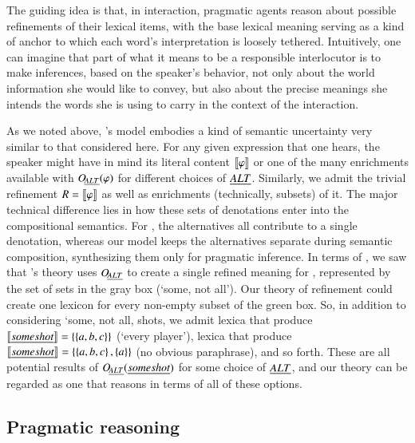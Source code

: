 \documentclass[leqno,12pt]{article}
\begin{document}
The guiding idea is that, in interaction, pragmatic agents reason
about possible refinements of their lexical items, with the base
lexical meaning serving as a kind of anchor to which each word's
interpretation is loosely tethered.  Intuitively, one can imagine that
part of what it means to be a responsible interlocutor is to make
inferences, based on the speaker's behavior, not only about the world
information she would like to convey, but also about the precise
meanings she intends the words she is using to carry in the context of
the interaction.


As we noted above, \CFS's model embodies a kind of semantic
uncertainty very similar to that considered here. For any given
expression that one hears, the speaker might have in mind its literal
content $\llbracket\varphi\rrbracket$ or one of the many enrichments available with
$\mathop{O\negthinspace_{\emph{ALT}}}(\varphi)$ for different choices of $\emph{ALT}$. Similarly, we admit
the trivial refinement $R = \llbracket\varphi\rrbracket$ as well as enrichments
(technically, subsets) of it. The major technical difference lies in
how these sets of denotations enter into the compositional
semantics. For \CFS, the alternatives all contribute to a single
denotation, whereas our model keeps the alternatives separate during
semantic composition, synthesizing them only for pragmatic
inference. In terms of , we saw that \CFS's theory
uses $\mathop{O\negthinspace_{\emph{ALT}}}$ to create a single refined meaning for ,
represented by the set of sets in the gray box (`some, not all'). Our
theory of refinement could create one lexicon for every non-empty
subset of the green box. So, in addition to considering `some, not
all, shots, we admit lexica that produce
$\llbracket\emph{some shot}\rrbracket = \left\{ \left\{ a,b,c \right\} \right\}$ (`every player'), lexica
that produce $\llbracket\emph{some shot}\rrbracket = \left\{ \left\{ a,b,c \right\},\left\{ a \right\} \right\}$
(no obvious paraphrase), and so forth. These are all potential results
of $\mathop{O\negthinspace_{\emph{ALT}}}(\emph{some shot})$ for some choice of $\emph{ALT}$, and our theory
can be regarded as one that reasons in terms of all of these options.


\subsection{Pragmatic reasoning}\label{sec:agents}
\end{document}
